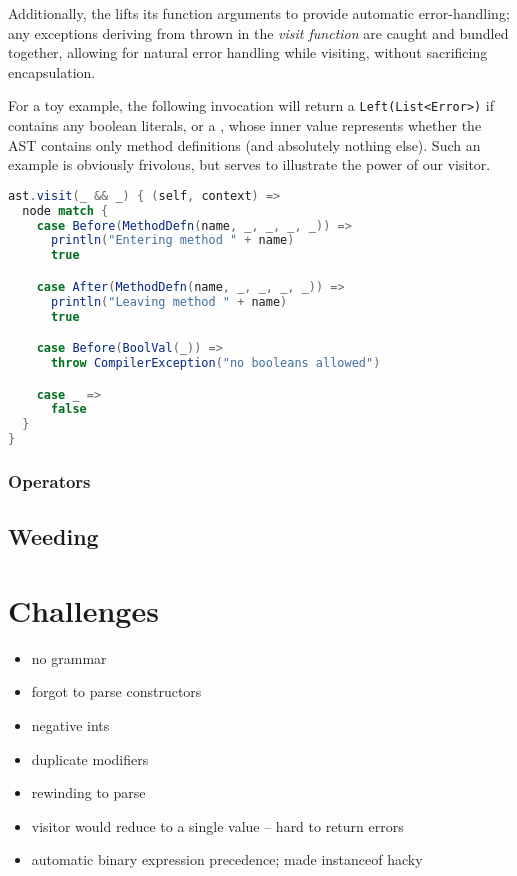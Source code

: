 \documentclass{article}
\begin{document}
Additionally, the \value{Visitor} lifts its function arguments to provide automatic error-handling; any exceptions
deriving from  thrown in the \textit{visit function} are caught and bundled together, allowing for
natural error handling while visiting, without sacrificing encapsulation.

For a toy example, the following invocation will return a \texttt{Left(List<Error>)} if \value{ast} contains any boolean
literals, or a \value{Right(Boolean)}, whose inner value represents whether the AST contains only method definitions
(and absolutely nothing else). Such an example is obviously frivolous, but serves to illustrate the power of our
visitor.

\begin{lstlisting}[language=Scala]
ast.visit(_ && _) { (self, context) =>
  node match {
    case Before(MethodDefn(name, _, _, _, _)) =>
      println("Entering method " + name)
      true

    case After(MethodDefn(name, _, _, _, _)) =>
      println("Leaving method " + name)
      true

    case Before(BoolVal(_)) =>
      throw CompilerException("no booleans allowed")

    case _ =>
      false
  }
}
\end{lstlisting}




\subsubsection{Operators}







\subsection{Weeding}




\section{Challenges}

\begin{itemize}
    \item no grammar
    \item forgot to parse constructors
    \item negative ints
    \item duplicate modifiers
    \item rewinding to parse
    \item visitor would reduce to a single value -- hard to return errors
    \item automatic binary expression precedence; made instanceof hacky
\end{itemize}
\end{document}

